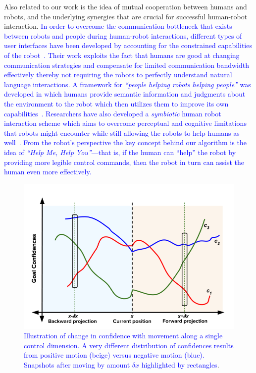 \documentclass[conference]{IEEEtran}
\begin{document}
Also related to our work is the idea of mutual cooperation between humans and robots, and the underlying synergies that are crucial for successful human-robot interaction. \textcolor{blue}{In order to overcome the communication bottleneck that exists between robots and people during human-robot interactions, different types of user interfaces have been developed by accounting for the constrained capabilities of the robot~\cite{goodfellow2010help}. Their work exploits the fact that humans are good at changing communication strategies and compensate for limited communication bandwidth effectively thereby not requiring the robots to perfectly understand natural language interactions. A framework for \textit{``people helping robots helping people''} was developed in which humans provide semantic information and judgments about the environment to the robot which then utilizes them to improve its own capabilities~\cite{sorokin2010people}. Researchers have also developed a \textit{symbiotic} human robot interaction scheme which aims to overcome perceptual and cognitive limitations that robots might encounter while still allowing the robots to help humans as well~\cite{rosenthal2010effective}. From the robot's perspective the key concept behind our algorithm is the idea of \textit{``Help Me, Help You''}---that is, if the human can ``help'' the robot by providing more legible control commands, then the robot in turn can assist the human even more effectively.}

\begin{figure}
	\includegraphics[width = 1\hsize, height = 0.26\vsize]{./figures/DisambMetric_New1.png}
	\vspace{-0.4cm}
	\caption{\textcolor{blue}{Illustration of change in confidence with movement along a single control dimension. A very different distribution of confidences results from positive motion (beige) versus negative motion (blue). Snapshots after moving by amount $\delta x$ highlighted by rectangles}.}
	\label{DM_FIG}
\end{figure}
\end{document}
